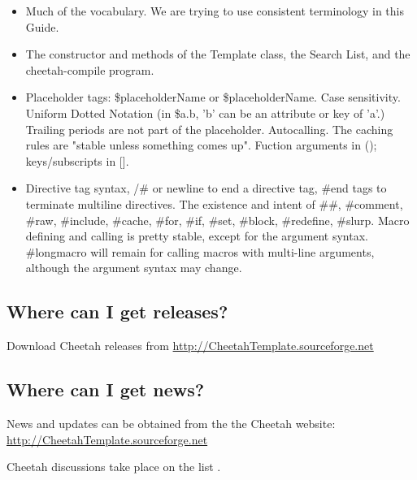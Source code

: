 \begin{itemize}

\item  Much of the vocabulary.  We are trying to use consistent terminology in
      this Guide.

\item  The constructor and methods of the Template class, the Search List, 
      and the cheetah-compile program.

\item  Placeholder tags:  \$placeholderName or \$placeholderName.  Case
      sensitivity.  Uniform Dotted Notation (in \$a.b, 'b' can be an attribute
      or key of 'a'.)  Trailing periods are not part of the placeholder.
      Autocalling.  The caching rules are "stable unless something comes up".
      Fuction arguments in (); keys/subscripts in [].

\item  Directive tag syntax, /\# or newline to end a directive tag, \#end tags 
      to terminate multiline directives.  The existence and intent of \#\#,
      \#comment, \#raw, \#include, \#cache, \#for, \#if, \#set, \#block, \#redefine,
      \#slurp.  Macro defining and calling is pretty stable, except for the
      argument syntax.  \#longmacro will remain for calling macros with
      multi-line arguments, although the argument syntax may change.

\end{itemize}


\subsection{Where can I get releases?}
\label{intro.releases}

Download Cheetah releases from
\url{http://CheetahTemplate.sourceforge.net}

\subsection{Where can I get news?}
\label{intro.news}

News and updates can be obtained from the the Cheetah website:
\url{http://CheetahTemplate.sourceforge.net}

Cheetah discussions take place on the list
.

